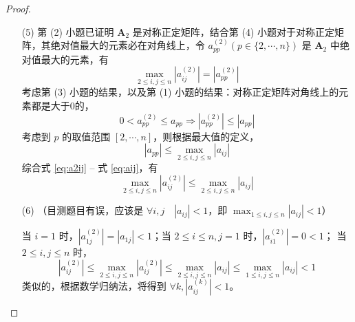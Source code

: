 \documentclass{sjtuarticle}
\begin{document}
\begin{itemize}
\begin{proof}
\begin{itemize}
            \item[(5)] 第 (2) 小题已证明 $\bm{A}_2$ 是对称正定矩阵，结合第 (4) 小题对于对称正定矩阵，其绝对值最大的元素必在对角线上，令 $a_{pp}^{(2)} (p\in \{2,\cdots,n\})$ 是 $\bm{A}_2$ 中绝对值最大的元素，有
            \begin{equation}\label{eq:a2ij}
                \max_{2\leq i,j\leq n} \left|a_{ij}^{(2)}\right| = \left|a_{pp}^{(2)}\right|
            \end{equation}
            考虑第 (3) 小题的结果，以及第 (1) 小题的结果：对称正定矩阵对角线上的元素都是大于0的，
            \begin{equation}
                0<a_{pp}^{(2)}\leq a_{pp} \Rightarrow \left|a_{pp}^{(2)}\right|\leq\left|a_{pp}\right|
            \end{equation}
            考虑到 $p$ 的取值范围 $[2,\cdots,n]$，则根据最大值的定义，
            \begin{equation}\label{eq:aij}
                \left|a_{pp}\right|\leq \max_{2\leq i,j\leq n} |a_{ij}|
            \end{equation}
            综合式 \eqref{eq:a2ij} -- 式 \eqref{eq:aij}，有
            \begin{equation*}
                \max_{2\leq i,j\leq n} \left|a_{ij}^{(2)}\right|\leq \max_{2\leq i,j\leq n} |a_{ij}|
            \end{equation*}

            \item[(6)]（目测题目有误，应该是 $\forall i,j\quad |a_{ij}|<1$，即 $\max_{1\leq i,j\leq n} |a_{ij}|<1$）%

            当 $i=1$ 时，$\left|a_{1j}^{(2)}\right|=|a_{1j}|<1$；当 $2\leq i\leq n, j=1$ 时，$\left|a_{i1}^{(2)}\right|=0<1$；
            当 $2\leq i,j\leq n$ 时，
            \begin{equation*}
                \left|a_{ij}^{(2)}\right|\leq \max_{2\leq i,j\leq n} \left|a_{ij}^{(2)}\right|
                \leq \max_{2\leq i,j\leq n} |a_{ij}|\leq \max_{1\leq i,j\leq n} |a_{ij}|<1
            \end{equation*}
            类似的，根据数学归纳法，将得到 $\forall k, \left|a_{ij}^{(k)}\right|<1$。
        \end{itemize}
    \end{proof}


\end{itemize}
\end{document}
